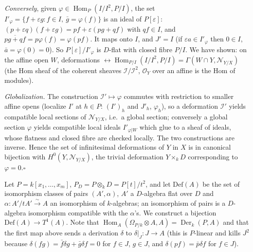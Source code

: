 \documentclass[11pt]{article}
\begin{document}
\emph{Conversely}, given $\varphi\in\operatorname{Hom}_P(I/I^2,P/I)$, the set $I'_\varphi=\{f+\varepsilon g:f\in I,\ \bar g=\varphi(f)\}$ is an ideal of $P[\varepsilon]$: $(p+\varepsilon q)(f+\varepsilon g)=pf+\varepsilon(pg+qf)$ with $qf\in I$, and $\overline{pg+qf}=p\varphi(f)=\varphi(pf)$. It maps onto $I$, and $J'=I$ (if $\varepsilon a\in I'_\varphi$ then $0\in I$, $\bar a=\varphi(0)=0$). So $P[\varepsilon]/I'_\varphi$ is $D$-flat with closed fibre $P/I$. We have shown: on the affine open $W$, deformations $\leftrightarrow\operatorname{Hom}_{P/I}(I/I^2,P/I)=\Gamma(W\cap Y,\mathcal N_{Y/X})$ (the Hom sheaf of the coherent sheaves $\mathcal I/\mathcal I^2$, $\mathcal O_Y$ over an affine is the Hom of modules).

\emph{Globalization.} The construction $\mathcal I'\mapsto\varphi$ commutes with restriction to smaller affine opens (localize $I'$ at $h\in P$: $(I')_h$ and $J'_h$, $\varphi_h$), so a deformation $\mathcal I'$ yields compatible local sections of $\mathcal N_{Y/X}$, i.e.\ a global section; conversely a global section $\varphi$ yields compatible local ideals $I'_{\varphi|W}$ which glue to a sheaf of ideals, whose flatness and closed fibre are checked locally. The two constructions are inverse. Hence the set of infinitesimal deformations of $Y$ in $X$ is in canonical bijection with $H^0(Y,\mathcal N_{Y/X})$, the trivial deformation $Y\times_kD$ corresponding to $\varphi=0$.\hfill$\square$

\pf
Let $P=k[x_1,\dots,x_m]$, $P_D=P\otimes_kD=P[t]/t^2$, and let $\mathrm{Def}(A)$ be the set of isomorphism classes of pairs $(A',\alpha)$, $A'$ a $D$-algebra flat over $D$ and $\alpha:A'/tA'\xrightarrow{\sim}A$ an isomorphism of $k$-algebras; an isomorphism of pairs is a $D$-algebra isomorphism compatible with the $\alpha$'s. We construct a bijection $\mathrm{Def}(A)\to T^1(A)$. Note that $\operatorname{Hom}_A(\Omega_{P/k}\otimes A,A)=\operatorname{Der}_k(P,A)$ and that the first map above sends a derivation $\delta$ to $\delta|_J:J\to A$ (this is $P$-linear and kills $J^2$ because $\delta(fg)=\bar f\delta g+\bar g\delta f=0$ for $f\in J$, $g\in J$, and $\delta(pf)=\bar p\delta f$ for $f\in J$).
\end{document}
